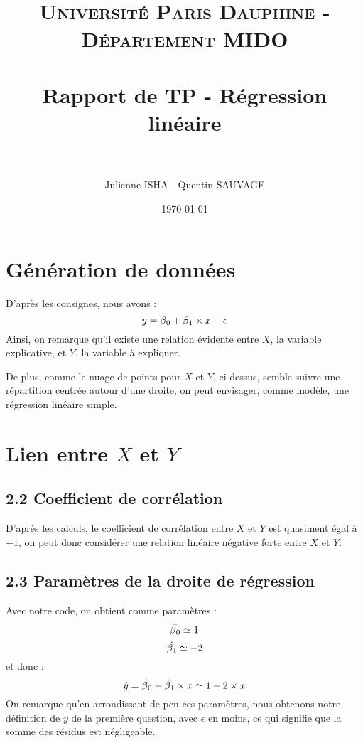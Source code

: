 \documentclass[paper=a4, fontsize=11pt]{scrartcl} %
\title{	
\normalfont \normalsize 
\textsc{Université Paris Dauphine - Département MIDO} \\ [25pt] %
\horrule{0.5pt} \\[0.4cm] %
\huge Rapport de TP - Régression linéaire \\ %
\horrule{2pt} \\[0.5cm] %
}
\author{Julienne ISHA - Quentin SAUVAGE} %
\date{\normalsize\today} %
\numberwithin{equation}{section} %
\numberwithin{figure}{section} %
\numberwithin{table}{section} %
\begin{document}
\begin{titlingpage}
\maketitle %
\end{titlingpage}
\newpage

\section{Génération de données}

	D'après les consignes, nous avons : \\
	\[y = \beta\textsubscript{0}+\beta\textsubscript{1}\times x+\epsilon\]
	Ainsi, on remarque qu'il existe une relation évidente entre $X$, la variable explicative, et $Y$, la variable à expliquer. 
	\begin{center}
	\end{center}
	De plus, comme le nuage de points pour $X$ et $Y$, ci-dessus, semble suivre une répartition centrée autour d'une droite, on peut envisager, comme modèle, une régression linéaire simple.

\newpage
\section{Lien entre $X$ et $Y$}
	\subsection*{2.2 Coefficient de corrélation}
		\begin{center}
		\end{center}
		D'après les calculs, le coefficient de corrélation entre $X$ et $Y$ est quasiment égal à $-1$, on peut donc considérer une relation linéaire négative forte entre $X$ et $Y$.


	\subsection*{2.3 Paramètres de la droite de régression}
		\begin{center}
		\end{center}
		Avec notre code, on obtient comme paramètres : 
		\[\hat{\beta\textsubscript{0}} \simeq 1\]
		\[\hat{\beta\textsubscript{1}} \simeq -2\]
		et donc : 
		\[\hat{y}=\hat{\beta\textsubscript{0}}+\hat{\beta\textsubscript{1}}\times x \simeq 1 - 2\times x \]
		On remarque qu'en arrondissant de peu ces paramètres, nous obtenons notre définition de $y$ de la première question, avec $\epsilon$ en moins, ce qui signifie que la somme des résidus est négligeable.
\end{document}
